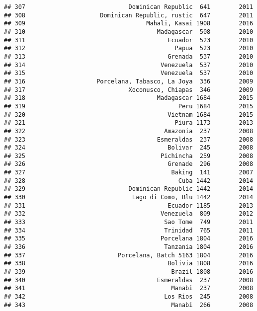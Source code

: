 \documentclass[
]{article}
\begin{document}
\begin{verbatim}
## 307                             Dominican Republic  641        2011
## 308                     Dominican Republic, rustic  647        2011
## 309                                  Mahali, Kasai 1908        2016
## 310                                     Madagascar  508        2010
## 311                                        Ecuador  523        2010
## 312                                          Papua  523        2010
## 313                                        Grenada  537        2010
## 314                                      Venezuela  537        2010
## 315                                      Venezuela  537        2010
## 316                    Porcelana, Tabasco, La Joya  336        2009
## 317                             Xoconusco, Chiapas  346        2009
## 318                                     Madagascar 1684        2015
## 319                                           Peru 1684        2015
## 320                                        Vietnam 1684        2015
## 321                                          Piura 1173        2013
## 322                                       Amazonia  237        2008
## 323                                     Esmeraldas  237        2008
## 324                                        Bolivar  245        2008
## 325                                      Pichincha  259        2008
## 326                                        Grenade  296        2008
## 327                                         Baking  141        2007
## 328                                           Cuba 1442        2014
## 329                             Dominican Republic 1442        2014
## 330                              Lago di Como, Blu 1442        2014
## 331                                        Ecuador 1185        2013
## 332                                      Venezuela  809        2012
## 333                                       Sao Tome  749        2011
## 334                                       Trinidad  765        2011
## 335                                      Porcelana 1804        2016
## 336                                       Tanzania 1804        2016
## 337                          Porcelana, Batch 5163 1804        2016
## 338                                        Bolivia 1808        2016
## 339                                         Brazil 1808        2016
## 340                                     Esmeraldas  237        2008
## 341                                         Manabi  237        2008
## 342                                       Los Rios  245        2008
## 343                                         Manabi  266        2008

\end{verbatim}
\end{document}
